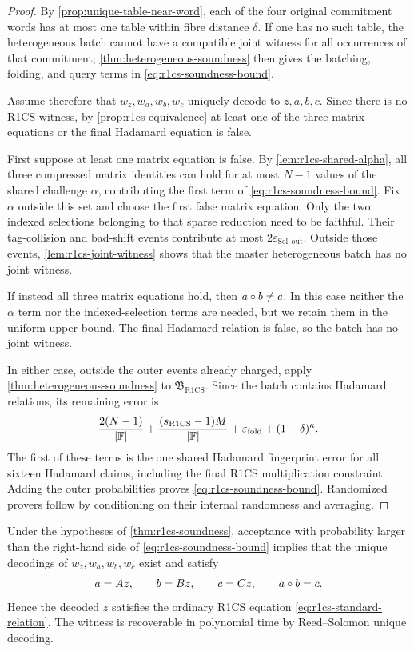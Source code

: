 \begin{proof}
By \cref{prop:unique-table-near-word}, each of the four original commitment words has at most one table within fibre distance $\delta$.  If one has no such table, the heterogeneous batch cannot have a compatible joint witness for all occurrences of that commitment; \cref{thm:heterogeneous-soundness} then gives the batching, folding, and query terms in \eqref{eq:r1cs-soundness-bound}.

Assume therefore that $w_z,w_a,w_b,w_c$ uniquely decode to $z,a,b,c$.  Since there is no R1CS witness, by \cref{prop:r1cs-equivalence} at least one of the three matrix equations or the final Hadamard equation is false.

First suppose at least one matrix equation is false.  By \cref{lem:r1cs-shared-alpha}, all three compressed matrix identities can hold for at most $N-1$ values of the shared challenge $\alpha$, contributing the first term of \eqref{eq:r1cs-soundness-bound}.  Fix $\alpha$ outside this set and choose the first false matrix equation.  Only the two indexed selections belonging to that sparse reduction need to be faithful.  Their tag-collision and bad-shift events contribute at most $2\varepsilon_{\mathrm{Sel,out}}$.  Outside those events, \cref{lem:r1cs-joint-witness} shows that the master heterogeneous batch has no joint witness.

If instead all three matrix equations hold, then $a\circ b\ne c$.  In this case neither the $\alpha$ term nor the indexed-selection terms are needed, but we retain them in the uniform upper bound.  The final Hadamard relation is false, so the batch has no joint witness.

In either case, outside the outer events already charged, apply \cref{thm:heterogeneous-soundness} to $\mathfrak B_{\mathrm{R1CS}}$.  Since the batch contains Hadamard relations, its remaining error is
\[
  \frac{2(N-1)}{|\mathbb{F}|}
  +\frac{(s_{\mathrm{R1CS}}-1)M}{|\mathbb{F}|}
  +\varepsilon_{\mathrm{fold}}
  +(1-\delta)^\kappa.
\]
The first of these terms is the one shared Hadamard fingerprint error for all sixteen Hadamard claims, including the final R1CS multiplication constraint.  Adding the outer probabilities proves \eqref{eq:r1cs-soundness-bound}.  Randomized provers follow by conditioning on their internal randomness and averaging.
\end{proof}

\begin{corollary}
\label{cor:r1cs-knowledge}
Under the hypotheses of \cref{thm:r1cs-soundness}, acceptance with probability larger than the right-hand side of \eqref{eq:r1cs-soundness-bound} implies that the unique decodings of $w_z,w_a,w_b,w_c$ exist and satisfy
\[
  a=Az,
  \qquad
  b=Bz,
  \qquad
  c=Cz,
  \qquad
  a\circ b=c.
\]
Hence the decoded $z$ satisfies the ordinary R1CS equation \eqref{eq:r1cs-standard-relation}.  The witness is recoverable in polynomial time by Reed--Solomon unique decoding.
\end{corollary}

